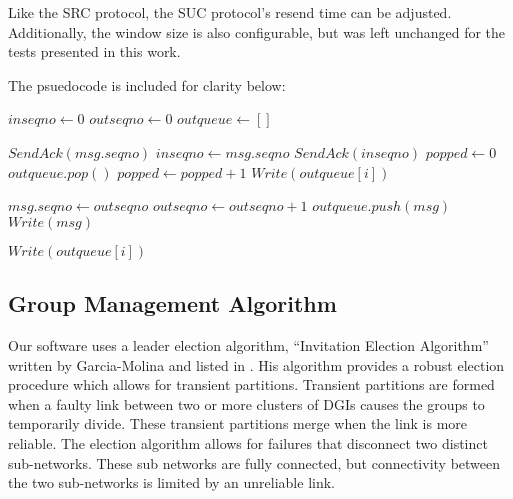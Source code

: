 Like the SRC protocol, the SUC protocol's resend time can be adjusted. 
Additionally, the window size is also configurable, but was left unchanged for 
the tests presented in this work.

The psuedocode is included for clarity below:

\begin{algorithmic}

\State $inseqno \gets 0$
\State $outseqno \gets 0$
\State $outqueue \gets []$

            \State $SendAck(msg.seqno)$
            \State $inseqno \gets msg.seqno$
        \Else
            \State $SendAck(inseqno)$
        \EndIf
        \State $popped \gets 0$
            \State $outqueue.pop()$
            \State $popped \gets popped+1$
        \EndIf
            \State $Write(outqueue[i])$
        \EndFor
    \EndIf
\EndFunction

    \State $msg.seqno \gets outseqno$
    \State $outseqno \gets outseqno+1$
    \State $outqueue.push(msg)$
        \State $Write(msg)$
    \EndIf
\EndFunction

        \State $Write(outqueue[i])$
    \EndFor
\EndFunction

\end{algorithmic}

\subsection{Group Management Algorithm}

Our software uses a leader election algorithm, ``Invitation Election 
Algorithm'' written by Garcia-Molina and listed in \cite{INVITATIONELECTION}. 
His algorithm provides a robust election procedure which allows for transient 
partitions. Transient partitions are formed when a faulty link between two or 
more clusters of DGIs causes the groups to temporarily divide. These transient 
partitions merge when the link is more reliable. The election algorithm 
allows for failures that disconnect two distinct sub-networks. These sub 
networks are fully connected, but connectivity between the two sub-networks is 
limited by an unreliable link.


